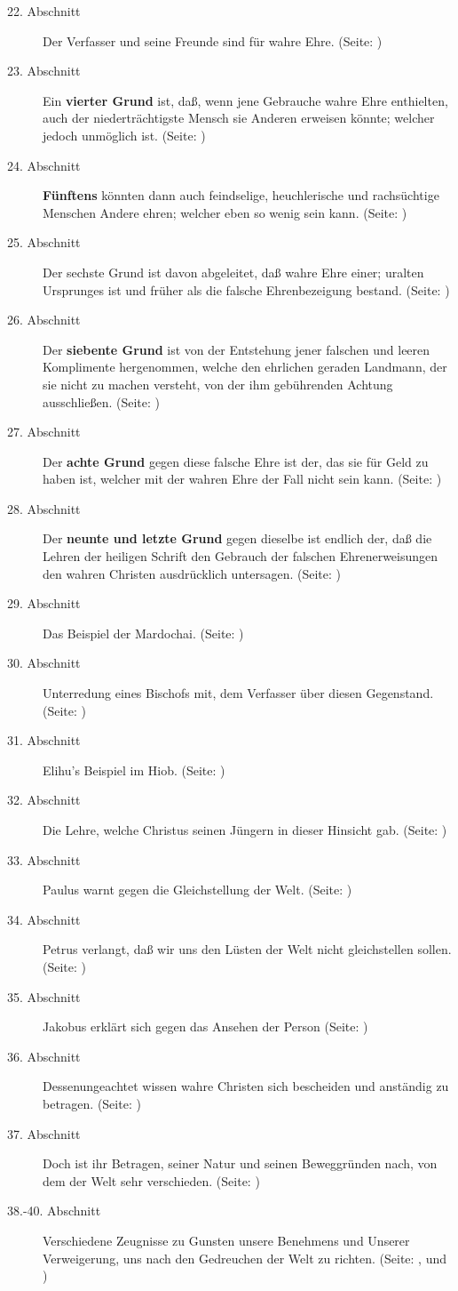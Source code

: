 \begin{description}
\item[22. Abschnitt] Der Verfasser und seine Freunde sind für wahre Ehre. (Seite: \pageref{kap9_ab22})
\item[23. Abschnitt] Ein \textbf{vierter Grund} ist, daß, wenn jene Gebrauche wahre Ehre
enthielten, auch der niederträchtigste Mensch sie Anderen erweisen könnte;
welcher jedoch unmöglich ist. (Seite: \pageref{kap9_ab23})
\item[24. Abschnitt] \textbf{Fünftens} könnten dann auch feindselige, heuchlerische und
rachsüchtige Menschen Andere ehren; welcher eben so wenig sein kann. (Seite: \pageref{kap9_ab24})
\item[25. Abschnitt] Der sechste Grund ist davon abgeleitet, daß wahre Ehre
einer; uralten Ursprunges ist und früher als die falsche Ehrenbezeigung bestand. (Seite: \pageref{kap9_ab25})
\item[26. Abschnitt] Der \textbf{siebente Grund} ist von der Entstehung jener falschen
und leeren Komplimente hergenommen, welche den ehrlichen geraden Landmann, der
sie nicht zu machen versteht, von der ihm gebührenden Achtung ausschließen. (Seite: \pageref{kap9_ab26})
\item[27. Abschnitt] Der \textbf{achte Grund} gegen diese falsche Ehre ist der, das sie
für Geld zu haben ist, welcher mit der wahren Ehre der Fall nicht sein kann. (Seite: \pageref{kap9_ab27})
\item[28. Abschnitt] Der \textbf{neunte und letzte Grund} gegen dieselbe ist endlich der,
daß die Lehren der heiligen Schrift den Gebrauch der falschen Ehrenerweisungen
den wahren Christen ausdrücklich untersagen. (Seite: \pageref{kap9_ab28})
\item[29. Abschnitt] Das Beispiel der Mardochai. (Seite: \pageref{kap9_ab29})
\item[30. Abschnitt] Unterredung eines Bischofs mit, dem Verfasser über diesen
Gegenstand. (Seite: \pageref{kap9_ab30})
\item[31. Abschnitt] Elihu's Beispiel im Hiob. (Seite: \pageref{kap9_ab31})
\item[32. Abschnitt] Die Lehre, welche Christus seinen Jüngern in dieser
Hinsicht gab. (Seite: \pageref{kap9_ab32})
\item[33. Abschnitt] Paulus warnt gegen die Gleichstellung der Welt. (Seite: \pageref{kap9_ab33})
\item[34. Abschnitt] Petrus verlangt, daß wir uns den Lüsten der Welt nicht
gleichstellen sollen. (Seite: \pageref{kap9_ab34})
\item[35. Abschnitt] Jakobus erklärt sich gegen das Ansehen der Person (Seite: \pageref{kap9_ab35})
\item[36. Abschnitt] Dessenungeachtet wissen wahre Christen sich bescheiden und
anständig zu betragen. (Seite: \pageref{kap9_ab36})
\item[37. Abschnitt] Doch ist ihr Betragen, seiner Natur und seinen Beweggründen
nach, von dem der Welt sehr verschieden. (Seite: \pageref{kap9_ab37})
\item[38.-40. Abschnitt] Verschiedene Zeugnisse zu Gunsten unsere Benehmens und
Unserer Verweigerung, uns nach den Gedreuchen der Welt zu richten. (Seite: \pageref{kap9_ab38}, \pageref{kap9_ab39} und \pageref{kap9_ab40})


\end{description}
